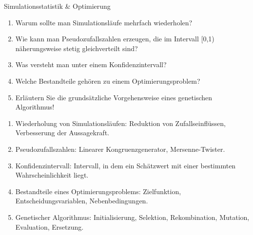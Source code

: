 \documentclass{article}
\begin{document}
\begin{exercise}{Simulationsstatistik \& Optimierung}
  \begin{enumerate}
    \item Warum sollte man Simulationsläufe mehrfach wiederholen?
    \item Wie kann man Pseudozufallszahlen erzeugen, die im Intervall [0,1) näherungsweise stetig gleichverteilt sind?
    \item Was versteht man unter einem Konfidenzintervall?
    \item Welche Bestandteile gehören zu einem Optimierungsproblem?
    \item Erläutern Sie die grundsätzliche Vorgehensweise eines genetischen Algorithmus!
  \end{enumerate}

  \begin{solution}
    \begin{enumerate}
      \item Wiederholung von Simulationsläufen: Reduktion von Zufallseinflüssen, Verbesserung der Aussagekraft.
      \item Pseudozufallszahlen: Linearer Kongruenzgenerator, Mersenne-Twister.
      \item Konfidenzintervall: Intervall, in dem ein Schätzwert mit einer bestimmten Wahrscheinlichkeit liegt.
      \item Bestandteile eines Optimierungsproblems: Zielfunktion, Entscheidungsvariablen, Nebenbedingungen.
      \item Genetischer Algorithmus: Initialisierung, Selektion, Rekombination, Mutation, Evaluation, Ersetzung.
    \end{enumerate}
  \end{solution}
\end{exercise}
\end{document}
